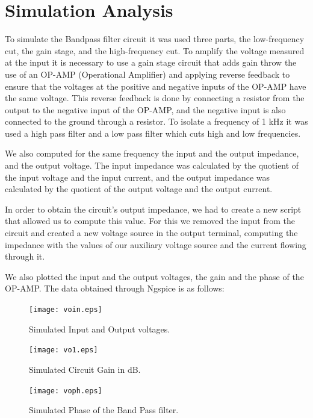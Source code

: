 \section{Simulation Analysis}
\label{sec:simulation}
To simulate the Bandpass filter circuit it was used three parts, the low-frequency cut, the gain stage, and the high-frequency cut.
To amplify the voltage measured at the input it is necessary to use a gain stage circuit that adds gain throw the use of an OP-AMP (Operational Amplifier) and applying reverse feedback to ensure that the voltages at the positive and negative inputs of the OP-AMP have the same voltage. This reverse feedback is done by connecting a resistor from the output to the negative input of the OP-AMP, and the negative input is also connected to the ground through a resistor.
To isolate a frequency of 1 kHz it was used a high pass filter and a low pass filter which cuts high and low frequencies.

We also computed for the same frequency the input and the output impedance, and the output voltage. The input impedance was calculated by the quotient of the input voltage and the input current, and the output impedance was calculated by the quotient of the output voltage and the output current.

In order to obtain the circuit's output impedance, we had to create a new script that allowed us to compute this value. For this we removed the input from the circuit and created a new voltage source in the output terminal, computing the impedance with the values of our auxiliary voltage source and the current flowing through it.

We also plotted the input and the output voltages, the gain and the phase of the OP-AMP.
The data obtained through Ngspice is as follows:

\begin{figure}[h] 
\centering
\texttt{[image: voin.eps]}
\caption{Simulated Input and Output voltages.}
\label{Fig3: InOutvoltage}
\end{figure}

\begin{figure}[H] 
\centering
\texttt{[image: vo1.eps]}
\caption{Simulated Circuit Gain in dB.}
\label{Fig4: GaindB}
\end{figure}

\begin{figure}[H] 
\centering
\texttt{[image: voph.eps]}
\caption{Simulated Phase of the Band Pass filter.}
\label{Fig5: Phase}
\end{figure}


